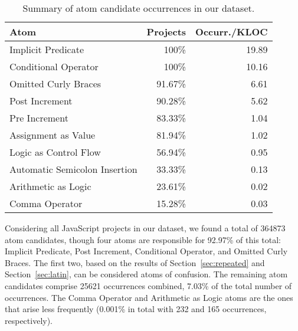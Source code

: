 \begin{table}[ht]
  \centering
\caption{Summary of atom candidate occurrences in our dataset.}
\label{tab:occurrences-summary}
\setlength\tabcolsep{2pt} %
\begin{tabular}{lrr}%
  \toprule
Atom & Projects & Occurr./KLOC \\%
  \midrule
Implicit Predicate & 100\% & 19.89 \\%
  Conditional Operator & 100\% & 10.16 \\%
  Omitted Curly Braces & 91.67\% & 6.61 \\%
  Post Increment & 90.28\% & 5.62 \\%
  Pre Increment & 83.33\% & 1.04 \\%
  Assignment as Value & 81.94\% & 1.02 \\%
  Logic as Control Flow & 56.94\% & 0.95 \\%
  Automatic Semicolon Insertion & 33.33\% & 0.13 \\%
  Arithmetic as Logic & 23.61\% & 0.02 \\%
  Comma Operator & 15.28\% & 0.03 \\%
   \bottomrule
\end{tabular}
  
\end{table}


Considering all JavaScript projects in our dataset, we found a total of \num{364873} atom candidates, though four atoms are responsible
for 92.97\% of this total: Implicit Predicate, Post Increment, Conditional Operator, and Omitted Curly Braces. The first two, based on the results of Section~\ref{sec:repeated} and Section~\ref{sec:latin}, can be considered atoms of confusion. The remaining atom
candidates comprise \num{25621} occurrences combined, 7.03\% of the total number of occurrences.
The Comma Operator and Arithmetic as Logic atoms are the ones that arise less
frequently (0.001\% in total with 232 and 165 occurrences, respectively). 

